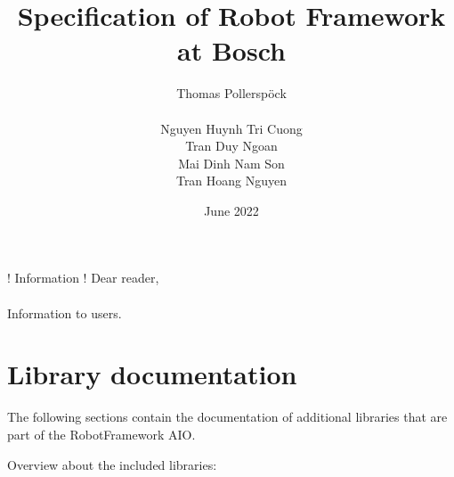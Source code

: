 \documentclass[a4paper,10pt]{report}
\begin{document}
\author{Thomas Pollerspöck \\ \\ Nguyen Huynh Tri Cuong \\ Tran Duy Ngoan \\ Mai Dinh Nam Son \\ Tran Hoang Nguyen}
\title{Specification of Robot Framework at Bosch}
\date{June 2022}


\maketitle

\begin{boxinfo}{! Information !}{
Dear reader, \\
\\
Information to users.
}
\end{boxinfo}

\tableofcontents

\listoftodos





\chapter{Library documentation}

The following sections contain the documentation of additional libraries that are part of the RobotFramework AIO.

Overview about the included libraries:





\end{document}
